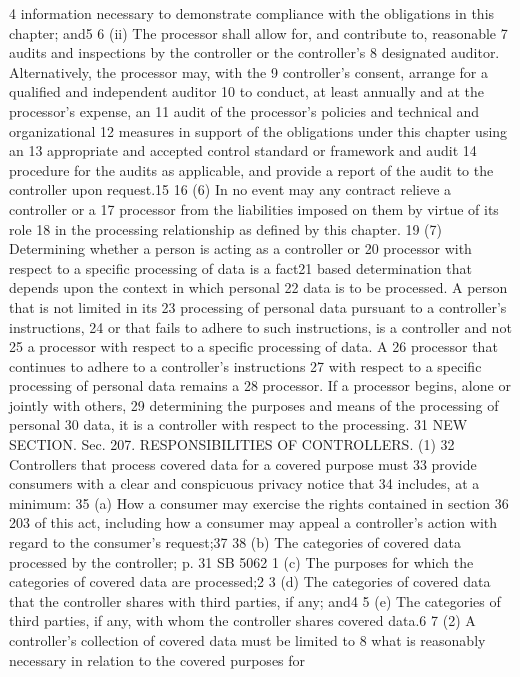 4 information necessary to demonstrate compliance with the obligations
in this chapter; and5
6 (ii) The processor shall allow for, and contribute to, reasonable
7 audits and inspections by the controller or the controller's
8 designated auditor. Alternatively, the processor may, with the
9 controller's consent, arrange for a qualified and independent auditor
10 to conduct, at least annually and at the processor's expense, an
11 audit of the processor's policies and technical and organizational
12 measures in support of the obligations under this chapter using an
13 appropriate and accepted control standard or framework and audit
14 procedure for the audits as applicable, and provide a report of the
audit to the controller upon request.15
16 (6) In no event may any contract relieve a controller or a
17 processor from the liabilities imposed on them by virtue of its role
18 in the processing relationship as defined by this chapter.
19 (7) Determining whether a person is acting as a controller or
20 processor with respect to a specific processing of data is a fact21 based determination that depends upon the context in which personal
22 data is to be processed. A person that is not limited in its
23 processing of personal data pursuant to a controller's instructions,
24 or that fails to adhere to such instructions, is a controller and not
25 a processor with respect to a specific processing of data. A
26 processor that continues to adhere to a controller's instructions
27 with respect to a specific processing of personal data remains a
28 processor. If a processor begins, alone or jointly with others,
29 determining the purposes and means of the processing of personal
30 data, it is a controller with respect to the processing.
31 NEW SECTION. Sec. 207. RESPONSIBILITIES OF CONTROLLERS. (1)
32 Controllers that process covered data for a covered purpose must
33 provide consumers with a clear and conspicuous privacy notice that
34 includes, at a minimum:
35 (a) How a consumer may exercise the rights contained in section
36 203 of this act, including how a consumer may appeal a controller's
action with regard to the consumer's request;37
38 (b) The categories of covered data processed by the controller;
p. 31 SB 5062
1 (c) The purposes for which the categories of covered data are
processed;2
3 (d) The categories of covered data that the controller shares
with third parties, if any; and4
5 (e) The categories of third parties, if any, with whom the
controller shares covered data.6
7 (2) A controller's collection of covered data must be limited to
8 what is reasonably necessary in relation to the covered purposes for
